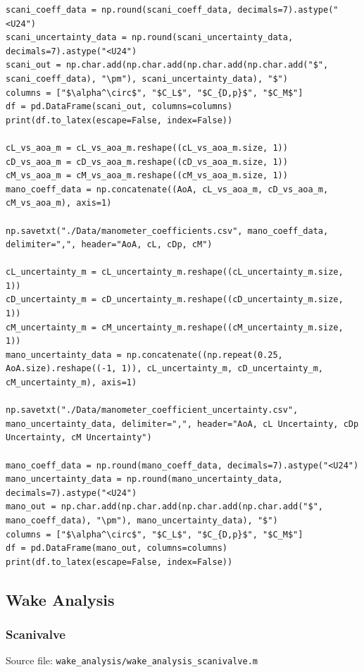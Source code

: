 \documentclass[runningheads]{llncs}
\begin{document}
\begin{verbatim}
scani_coeff_data = np.round(scani_coeff_data, decimals=7).astype("<U24")
scani_uncertainty_data = np.round(scani_uncertainty_data, decimals=7).astype("<U24")
scani_out = np.char.add(np.char.add(np.char.add(np.char.add("$", scani_coeff_data), "\pm"), scani_uncertainty_data), "$")
columns = ["$\alpha^\circ$", "$C_L$", "$C_{D,p}$", "$C_M$"]
df = pd.DataFrame(scani_out, columns=columns)
print(df.to_latex(escape=False, index=False))

cL_vs_aoa_m = cL_vs_aoa_m.reshape((cL_vs_aoa_m.size, 1))
cD_vs_aoa_m = cD_vs_aoa_m.reshape((cD_vs_aoa_m.size, 1))
cM_vs_aoa_m = cM_vs_aoa_m.reshape((cM_vs_aoa_m.size, 1))
mano_coeff_data = np.concatenate((AoA, cL_vs_aoa_m, cD_vs_aoa_m, cM_vs_aoa_m), axis=1)

np.savetxt("./Data/manometer_coefficients.csv", mano_coeff_data, delimiter=",", header="AoA, cL, cDp, cM")

cL_uncertainty_m = cL_uncertainty_m.reshape((cL_uncertainty_m.size, 1))
cD_uncertainty_m = cD_uncertainty_m.reshape((cD_uncertainty_m.size, 1))
cM_uncertainty_m = cM_uncertainty_m.reshape((cM_uncertainty_m.size, 1))
mano_uncertainty_data = np.concatenate((np.repeat(0.25, AoA.size).reshape((-1, 1)), cL_uncertainty_m, cD_uncertainty_m, cM_uncertainty_m), axis=1)

np.savetxt("./Data/manometer_coefficient_uncertainty.csv", mano_uncertainty_data, delimiter=",", header="AoA, cL Uncertainty, cDp Uncertainty, cM Uncertainty")

mano_coeff_data = np.round(mano_coeff_data, decimals=7).astype("<U24")
mano_uncertainty_data = np.round(mano_uncertainty_data, decimals=7).astype("<U24")
mano_out = np.char.add(np.char.add(np.char.add(np.char.add("$", mano_coeff_data), "\pm"), mano_uncertainty_data), "$")
columns = ["$\alpha^\circ$", "$C_L$", "$C_{D,p}$", "$C_M$"]
df = pd.DataFrame(mano_out, columns=columns)
print(df.to_latex(escape=False, index=False))

\end{verbatim}

\subsection{Wake Analysis}

\subsubsection{Scanivalve}

Source file: \verb|wake_analysis/wake_analysis_scanivalve.m|
\end{document}

